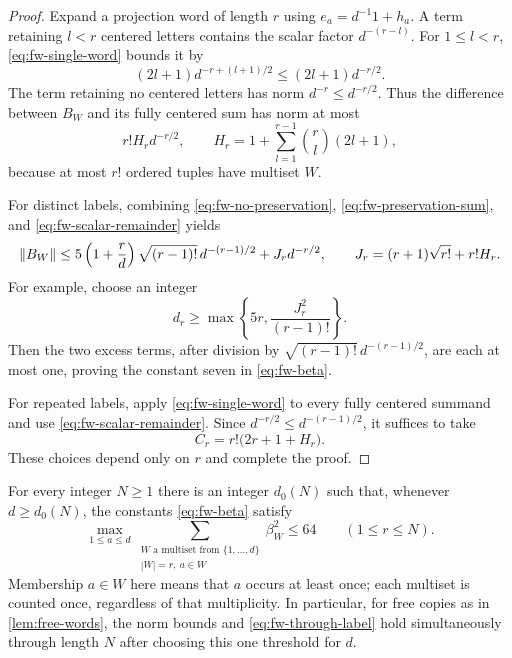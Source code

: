 \begin{proof}
Expand a projection word of length $r$ using $e_a=d^{-1}1+h_a$.
A term retaining $l<r$ centered letters contains the scalar factor
$d^{-(r-l)}$.  For $1\leq l<r$, \eqref{eq:fw-single-word} bounds it by
\[
 (2l+1)d^{-r+(l+1)/2}\leq(2l+1)d^{-r/2}.
\]
The term retaining no centered letters has norm $d^{-r}\leq d^{-r/2}$.
Thus the difference between $B_W$ and its fully centered sum has
norm at most
\begin{equation}\label{eq:fw-scalar-remainder}
 r! H_r d^{-r/2},
 \qquad
 H_r=1+\sum_{l=1}^{r-1}\binom rl(2l+1),
\end{equation}
because at most $r!$ ordered tuples have multiset $W$.

For distinct labels, combining
\eqref{eq:fw-no-preservation}, \eqref{eq:fw-preservation-sum}, and
\eqref{eq:fw-scalar-remainder} yields
\[
 \lVert B_W\rVert
 \leq5\left(1+\frac rd\right)
           \sqrt{(r-1)!}\,d^{-(r-1)/2}
       +J_r d^{-r/2},
 \qquad J_r=(r+1)\sqrt{r!}+r!H_r.
\]
For example, choose an integer
\[
 d_r\geq\max\left\{5r,\frac{J_r^2}{(r-1)!}\right\}.
\]
Then the two excess terms, after division by
$\sqrt{(r-1)!}\,d^{-(r-1)/2}$, are each at most one, proving the
constant seven in \eqref{eq:fw-beta}.

For repeated labels, apply \eqref{eq:fw-single-word} to every fully
centered summand and use \eqref{eq:fw-scalar-remainder}.  Since
$d^{-r/2}\leq d^{-(r-1)/2}$, it suffices to take
\[
 C_r=r!\bigl(2r+1+H_r\bigr).
\]
These choices depend only on $r$ and complete the proof.
\end{proof}

\begin{corollary}
\label{cor:through-label}
For every integer $N\geq1$ there is an integer $d_0(N)$ such that,
whenever $d\geq d_0(N)$, the constants \eqref{eq:fw-beta} satisfy
\begin{equation}\label{eq:fw-through-label}
 \max_{1\leq a\leq d}
 \sum_{\substack{W\text{ a multiset from }\{1,\ldots,d\}\\
                 |W|=r,\ a\in W}}
       \beta_W^2\leq64
 \qquad(1\leq r\leq N).
\end{equation}
Membership $a\in W$ here means that $a$ occurs at least once;
each multiset is counted once, regardless of that multiplicity.
In particular, for free copies as in \cref{lem:free-words}, the norm
bounds and \eqref{eq:fw-through-label} hold simultaneously through
length $N$ after choosing this one threshold for $d$.
\end{corollary}

